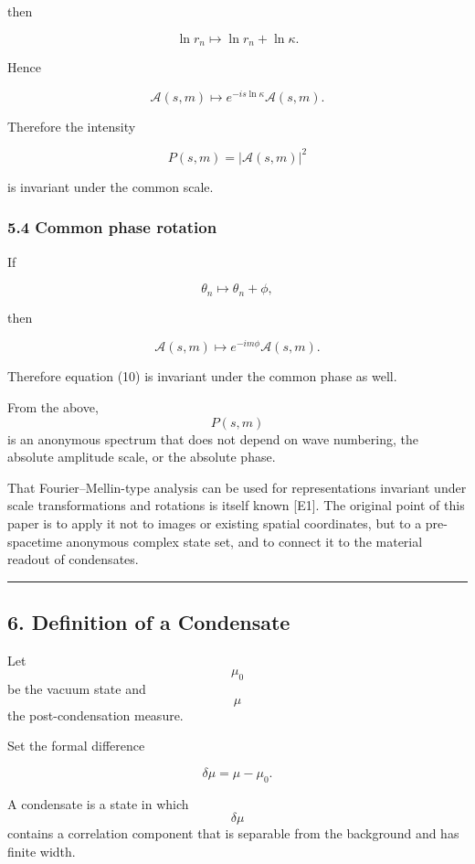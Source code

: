 \documentclass[
  a4paper,
]{article}
\begin{document}
then

\[
\ln r_n
\mapsto
\ln r_n+\ln\kappa.
\]

Hence

\[
\mathcal A(s,m)
\mapsto
 e^{-is\ln\kappa}
\mathcal A(s,m).
\tag{9}
\]

Therefore the intensity

\[
\boxed{
P(s,m)
=
|\mathcal A(s,m)|^2
}
\tag{10}
\]

is invariant under the common scale.

\subsubsection{5.4 Common phase rotation}\label{common-phase-rotation}

If

\[
\theta_n
\mapsto
\theta_n+\phi,
\]

then

\[
\mathcal A(s,m)
\mapsto
 e^{-im\phi}
\mathcal A(s,m).
\tag{11}
\]

Therefore equation (10) is invariant under the common phase as well.

From the above, \[P(s,m)\] is an anonymous spectrum that does not depend
on wave numbering, the absolute amplitude scale, or the absolute phase.

That Fourier--Mellin-type analysis can be used for representations
invariant under scale transformations and rotations is itself known
{[}E1{]}. The original point of this paper is to apply it not to images
or existing spatial coordinates, but to a pre-spacetime anonymous
complex state set, and to connect it to the material readout of
condensates.

\begin{center}\rule{0.5\linewidth}{0.5pt}\end{center}

\subsection{6. Definition of a
Condensate}\label{definition-of-a-condensate}

Let \[\mu_0\] be the vacuum state and \[\mu\] the post-condensation
measure.

Set the formal difference

\[
\delta\mu
=
\mu-\mu_0.
\tag{12}
\]

A condensate is a state in which \[\delta\mu\] contains a correlation
component that is separable from the background and has finite width.
\end{document}
